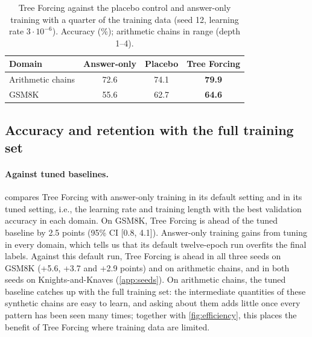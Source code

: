 \documentclass{article}
\newcommand{\tf}{Tree Forcing}
\begin{document}
\begin{table}[t]
\centering
\small
\caption{\tf{} against the placebo control and answer-only training with a quarter of the training data (seed 12,
learning rate $3\cdot10^{-6}$). Accuracy (\%); arithmetic chains in range (depth 1--4).}
\label{tab:placebo}
\begin{tabular}{lccc}
\toprule
Domain & Answer-only & Placebo & \tf{} \\
\midrule
Arithmetic chains & 72.6 & 74.1 & \textbf{79.9} \\
GSM8K & 55.6 & 62.7 & \textbf{64.6} \\
\bottomrule
\end{tabular}
\end{table}

\subsection{Accuracy and retention with the full training set}
\label{sec:accuracy}

\paragraph{Against tuned baselines.}  compares \tf{} with answer-only training in its default setting
and in its tuned setting, i.e., the learning rate and training length with the best validation accuracy in each
domain. On GSM8K, \tf{} is ahead of the tuned baseline by 2.5 points (95\% CI [0.8, 4.1]). Answer-only training gains
from tuning in every domain, which tells us that its default twelve-epoch run overfits the final labels. Against this
default run, \tf{} is ahead in all three seeds on GSM8K (+5.6, +3.7 and +2.9 points) and on arithmetic chains, and in
both seeds on Knights-and-Knaves (\cref{app:seeds}). On arithmetic chains, the tuned baseline catches up with the full
training set: the intermediate quantities of these synthetic chains are easy to learn, and asking about them adds
little once every pattern has been seen many times; together with \cref{fig:efficiency}, this places the benefit of
\tf{} where training data are limited.
\end{document}
